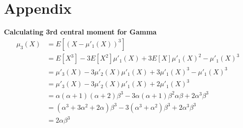 \documentclass[conference]{IEEEtran}
\begin{document}
\section{Appendix}
\textbf{Calculating 3rd central moment for Gamma}
\begin{align*}
\mu_{3}(X) &= E[(X - \mu'_{1}(X))^3] \\
&= E[X^3] - 3 E[X^2] \mu'_{1}(X) + 3 E[X] \mu'_{1}(X) ^ 2 - \mu'_{1}(X)^3 \\
&= \mu'_{3}(X) - 3\mu'_{2}(X) \mu'_{1}(X) + 3 \mu'_{1}(X)^3 - \mu'_{1}(X)^3 \\
\label{3rd_central_moment_gamma}
&= \mu'_{3}(X) - 3\mu'_{2}(X) \mu'_{1}(X) + 2 \mu'_{1}(X)^3 \\
&= \alpha (\alpha + 1) (\alpha + 2) \beta^3 - 3 \alpha (\alpha + 1) \beta^2 \alpha \beta + 2 \alpha^3 \beta^3 \\
&= (\alpha^3 + 3 \alpha^2 + 2\alpha)\beta^3 - 3 (\alpha^3 + \alpha^2)\beta^3 + 2 \alpha^3 \beta^3 \\
&= 2 \alpha \beta^3
\end{align*}
\end{document}
